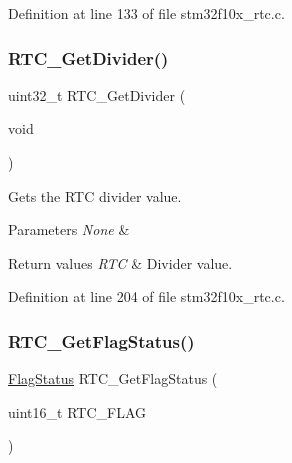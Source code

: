Definition at line 133 of file stm32f10x\+\_\+rtc.\+c.

\mbox{\label{group___r_t_c___exported___functions_gaa4f00e0469fedcf6cbf23760e6d801ed}} 
\subsubsection{\texorpdfstring{R\+T\+C\+\_\+\+Get\+Divider()}{RTC\_GetDivider()}}
{\footnotesize\ttfamily uint32\+\_\+t R\+T\+C\+\_\+\+Get\+Divider (\begin{DoxyParamCaption}\item[{void}]{ }\end{DoxyParamCaption})}



Gets the R\+TC divider value. 


\begin{DoxyParams}{Parameters}
{\em None} & \\
\hline
\end{DoxyParams}

\begin{DoxyRetVals}{Return values}
{\em R\+TC} & Divider value. \\
\hline
\end{DoxyRetVals}


Definition at line 204 of file stm32f10x\+\_\+rtc.\+c.

\mbox{\label{group___r_t_c___exported___functions_ga21a85e5f846cb4552d5e76420779f3f6}} 
\subsubsection{\texorpdfstring{R\+T\+C\+\_\+\+Get\+Flag\+Status()}{RTC\_GetFlagStatus()}}
{\footnotesize\ttfamily \hyperlink{group___exported__types_ga89136caac2e14c55151f527ac02daaff}{Flag\+Status} R\+T\+C\+\_\+\+Get\+Flag\+Status (\begin{DoxyParamCaption}\item[{uint16\+\_\+t}]{R\+T\+C\+\_\+\+F\+L\+AG }\end{DoxyParamCaption})}



